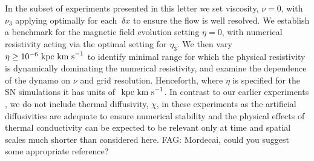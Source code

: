 \documentclass[preprint2]{aastex63}
\newcommand\kpc{~ {\rm kpc}}
\newcommand\dx{~ {\delta x}}
\newcommand\kms{~ {\rm km~ s}^{-1}}
\newcommand{\fag}[1]{\textcolor{midgreen}{FAG: #1}}
\begin{document}
In the subset of experiments presented in this letter we set viscosity, $\nu=0$,
with $\nu_3$ applying optimally for each $\dx$ to ensure the flow is well
resolved.
We establish a benchmark for the magnetic field evolution setting $\eta=0$, with
numerical resistivity acting via the optimal setting for $\eta_3$.
We then vary $\eta\geq10^{-6}\kpc\kms$ to identify minimal range for which the
physical resistivity is dynamically dominating the numerical resistivity, and
examine the dependence of the dynamo on $\nu$ and grid resolution.
Henceforth, where $\eta$ is specified for the SN simulations it has units of
$\kpc\kms$. 
In contrast to our earlier experiments \citep{Gent:2013a,Gent:2013b,GMKSH20},
we do not include thermal diffusivity, $\chi$, in these experiments as the
artificial diffusivities are adequate to ensure numerical stability and the
physical effects of thermal conductivity can be expected to be relevant only
at time and spatial scales much shorter than considered here.
\fag{Mordecai, could you suggest some appropriate reference?}
\end{document}
